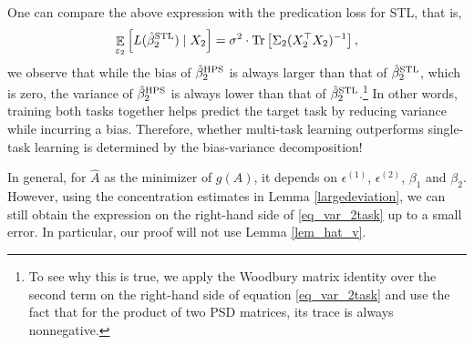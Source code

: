 One can compare the above expression with the predication loss for STL, that is,
\begin{align}
	\mathop{\mathbb{E}}_{\varepsilon_2}\left[ L(\hat{\beta}_2^{\textup{STL}}) \mid X_2 \right] = \sigma^2 \cdot \operatorname{Tr}\left[\Sigma_2 (X_2^{\top} X_2)^{-1}\right], \label{eq_var_stl}
\end{align}
we observe that while the bias of $\hat{\beta}_2^{\textup{HPS}}$ is always larger than that of $\hat{\beta}_2^{\textup{STL}}$, which is zero, the variance of $\hat{\beta}_2^{\textup{HPS}}$ is always lower than that of $\hat{\beta}_2^{\textup{STL}}$.\footnote{To see why this is true, we apply the Woodbury matrix identity over the second term on the right-hand side of equation \eqref{eq_var_2task} and use the fact that for the product of two PSD matrices, its trace is always nonnegative.}
In other words, training both tasks together helps predict the target task by reducing variance while incurring a bias.
Therefore, whether multi-task learning outperforms single-task learning is determined by the bias-variance decomposition!


In general, for $\hat A$ as  the minimizer of $g(A)$, it depends on $\epsilon^{(1)}$, $\epsilon^{(2)}$, $\beta_1$ and $\beta_2$. However, using the concentration estimates in Lemma \ref{largedeviation}, we can still obtain the expression on the right-hand side of \eqref{eq_var_2task} up to a small error. In particular, our proof will not use Lemma \ref{lem_hat_v}.

